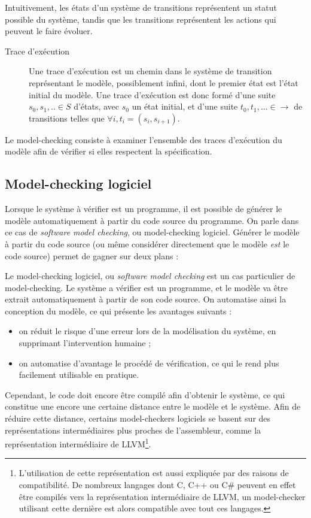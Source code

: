 Intuitivement, les états d'un système de transitions représentent un
statut possible du système, tandis que les transitions représentent les
actions qui peuvent le faire évoluer.

\begin{description}
\item[Trace d'exécution]
Une trace d'exécution est un chemin dans le système de transition
représentant le modèle, possiblement infini, dont le premier état est
l'état initial du modèle. Une trace d'exécution est donc formé d'une
suite \(s_0, s_1, .. \in S\) d'états, avec \(s_0\) un état initial, et
d'une suite \(t_0, t_1, ... \in \rightarrow\) de transitions telles que
\(\forall i, t_i = (s_i, s_{i+1})\).
\end{description}

Le model-checking consiste à examiner l'ensemble des traces
d'exécution du modèle afin de vérifier si elles respectent la spécification.

\subsection{Model-checking logiciel}

Lorsque le système à vérifier est un programme, il est possible de
générer le modèle automatiquement à partir du code source du programme.
On parle dans ce cas de \emph{software model checking}, ou
model-checking logiciel. Générer le modèle à partir du code source (ou
même considérer directement que le modèle \emph{est} le code source)
permet de gagner sur deux plans :

Le model-checking logiciel, ou \emph{software model checking} est un cas
particulier de model-checking. Le système a vérifier est un programme, et le
modèle va être extrait automatiquement à partir de son code source.
On automatise ainsi la conception du modèle, ce qui présente les avantages
suivants :

\begin{itemize}
\item
  on réduit le risque d'une erreur lors de la modélisation du système,
  en supprimant l'intervention humaine ;
\item
  on automatise d'avantage le procédé de vérification, ce qui le rend
  plus facilement utilisable en pratique.
\end{itemize}

Cependant, le code doit encore être compilé afin d'obtenir le système,
ce qui constitue une encore une certaine distance entre le modèle et le
système. Afin de réduire cette distance, certains
model-checkers logiciels se basent sur des représentations intermédiaires
plus proches de l'assembleur, comme la représentation intermédiaire de
LLVM\footnote{L'utilisation de cette représentation est aussi expliquée
  par des raisons de compatibilité. De nombreux langages dont C, C++ ou
  C\# peuvent en effet être compilés vers la représentation
  intermédiaire de LLVM, un model-checker utilisant cette dernière est
  alors compatible avec tout ces langages.}.

